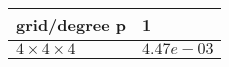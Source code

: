 \begin{tabular}{ll}
\hline
 grid/degree p         & 1          \\
\hline
 $4 \times 4 \times 4$ & $4.47e-03$ \\
\hline
\end{tabular}